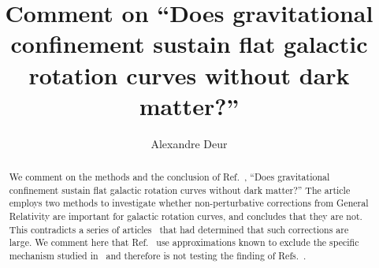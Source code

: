 \documentclass[superscriptaddress,amsmath,amssymb,nofootinbib]{revtex4}
\begin{document}
\title{Comment on ``Does gravitational confinement sustain flat galactic rotation curves without dark matter?''}
\author{Alexandre Deur}

\begin{abstract}

We comment on the methods and the conclusion of Ref.~\cite{Barker:2023xsx}, ``Does gravitational confinement sustain flat galactic rotation curves without dark matter?''
The article employs two methods to investigate whether non-perturbative corrections from General Relativity  are important for galactic rotation curves, 
and concludes that they are not. This contradicts a series of articles~\cite{Deur:2009ya, Deur:2016bwq, Deur:2020wlg} that had 
determined that such corrections are large. We comment here that Ref.~\cite{Barker:2023xsx} use approximations known to exclude 
the specific mechanism studied in~\cite{Deur:2009ya, Deur:2016bwq, Deur:2020wlg} and therefore is not testing the finding of Refs.~\cite{Deur:2009ya, Deur:2016bwq, Deur:2020wlg}.

\end{abstract}


\maketitle
\end{document}
